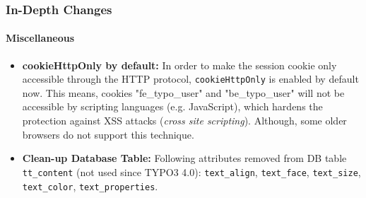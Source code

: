 \begin{frame}[fragile]
	\frametitle{In-Depth Changes}
	\framesubtitle{Miscellaneous}

	\begin{itemize}

		\item \textbf{cookieHttpOnly by default:}\newline
			\small
				In order to make the session cookie only accessible through the HTTP protocol, \texttt{cookieHttpOnly} is enabled by default now.\newline
				This means, cookies "fe\_typo\_user" and "be\_typo\_user" will not be accessible by scripting languages (e.g. JavaScript), which hardens the protection against XSS attacks (\textit{cross site scripting}). Although, some older browsers do not support this technique.
			\normalsize

		\item \textbf{Clean-up Database Table:}\newline
			\small
				Following attributes removed from DB table \texttt{tt\_content} (not used since TYPO3 4.0):
				\texttt{text\_align}, \texttt{text\_face}, \texttt{text\_size}, \texttt{text\_color}, \texttt{text\_properties}.
			\normalsize

	\end{itemize}
	
\end{frame}


